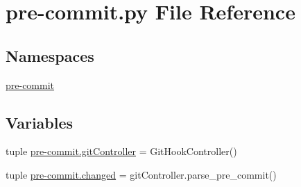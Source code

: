 \section{pre-\/commit.py File Reference}
\label{pre-commit_8py}
\subsection*{Namespaces}
\begin{DoxyCompactItemize}
\item 
\hyperlink{namespacepre-commit}{pre-\/commit}
\end{DoxyCompactItemize}
\subsection*{Variables}
\begin{DoxyCompactItemize}
\item 
tuple \hyperlink{namespacepre-commit_a95f05a041aa51857ded4a498e766b83d}{pre-\/commit.\-git\-Controller} = Git\-Hook\-Controller()
\item 
tuple \hyperlink{namespacepre-commit_a1c824fbe54d00a54423cb4955f97dcf5}{pre-\/commit.\-changed} = git\-Controller.\-parse\-\_\-pre\-\_\-commit()
\end{DoxyCompactItemize}
